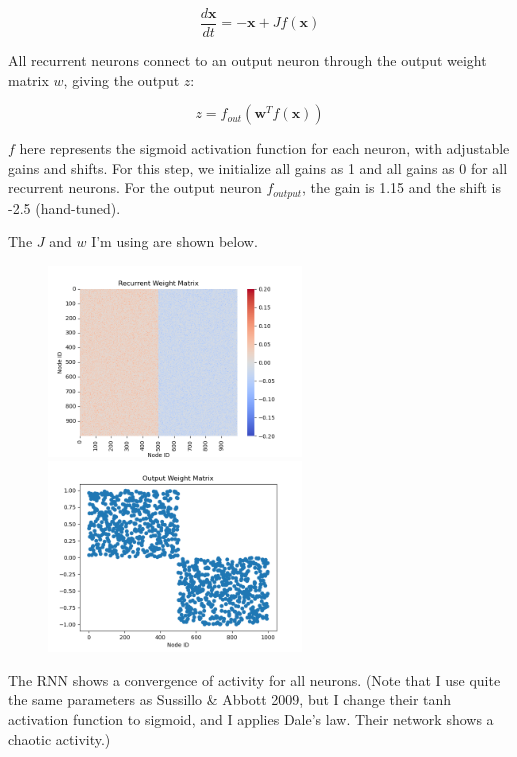 \documentclass[12pt, a4paper]{article}
\begin{document}
$$\frac{d\mathbf{x}}{dt} = -\mathbf{x} + J f(\mathbf{x}) $$

All recurrent neurons connect to an output neuron through the output weight matrix $w$, giving the output $z$:

$$z = f_{out}(\mathbf{w}^T f(\mathbf{x}))$$

$f$ here represents the sigmoid activation function for each neuron, with adjustable gains and shifts. For this step, we initialize all gains as 1 and all gains as 0 for all recurrent neurons. For the output neuron $f_{output}$, the gain is 1.15 and the shift is -2.5 (hand-tuned).

The $J$ and $w$ I'm using are shown below.

\begin{figure}[H]
    \centering
    \includegraphics[width=0.6\textwidth]{RNN/FORCE/fig/FORCE_nofb_rcweight.png} \\
    \includegraphics[width=0.6\textwidth]{RNN/FORCE/fig/FORCE_nofb_outweight.png} \\
\end{figure}

The RNN shows a convergence of activity for all neurons. (Note that I use quite the same parameters as Sussillo \& Abbott 2009, but I change their tanh activation function to sigmoid, and I applies Dale's law. Their network shows a chaotic activity.)
\end{document}
